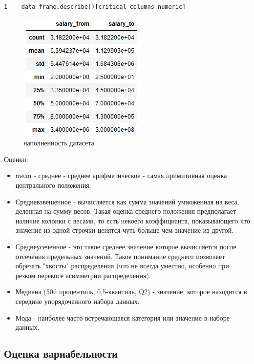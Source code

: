 \documentclass[12pt, a4paper]{article}
\begin{document}
{\newpage

\begin{verbatim}
1    data_frame.describe()[critical_columns_numeric]
\end{verbatim}

\begin{figure}[h]
    \begin{center}
        \includegraphics[scale=1,keepaspectratio]
        {Pictures/Picture_6.jpg}
        \caption{наполненность датасета}
        \label{Picture_6}
    \end{center}
\end{figure}

Оценки:
\begin{itemize}
    \item mean - среднее - среднее арифметическое - самая 
    примитивная оценка центрального положения.
    \item Средневзвешенное - вычисляется как сумма значений 
    умноженная на веса, деленная на сумму весов. Такая оценка 
    среднего положения предполагает наличие колонки с весами, 
    то есть некоего коэффицианта, показывающего что значение 
    из одной строчки ценятся чуть больше чем значение из другой.
    \item Среднеусеченное - это такое среднее значение 
    которое вычисляется после отсечения предельных значений. 
    Такое понимание среднего позволяет обрезать "хвосты" 
    распределения (что не всегда уместно, особенно при резком 
    перекосе асимметрии распределения). 
    \item Медиана (50й процентиль, 0,5-квантиль, Q2) - значение, 
    которое находится в середине упорядоченного набора данных.
    \item Мода - наиболее часто встречающаяся категория или 
    значение в наборе данных. 
\end{itemize}

\subsection{Оценка вариабельности}

}
\end{document}

